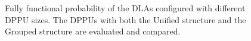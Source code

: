 \begin{figure}
\setlength{\abovecaptionskip}{-10pt}
\setlength{\belowcaptionskip}{0pt}
    \caption{Fully functional probability of the DLAs configured with different DPPU sizes. The DPPUs with both the Unified structure and the Grouped structure are evaluated and compared.}
\label{fig:DPPU}
\vspace{-1.5em}
\end{figure}


